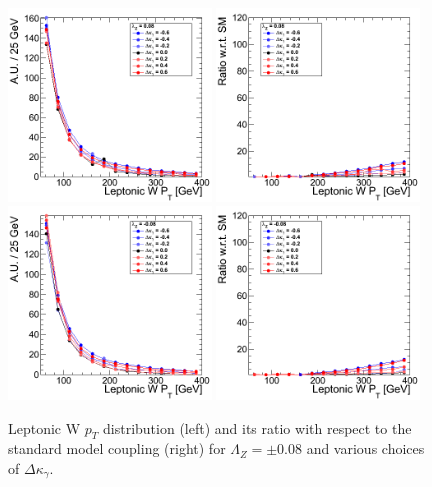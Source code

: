 \begin{figure}[h!t]
  {\centering
    \includegraphics[width=0.48\textwidth]{figs/LeptonicWpT_008.png}
    \includegraphics[width=0.48\textwidth]{figs/LeptonicWpT_008_ratio.png}
    \includegraphics[width=0.48\textwidth]{figs/LeptonicWpT_m008.png}
    \includegraphics[width=0.48\textwidth]{figs/LeptonicWpT_m008_ratio.png}
    \caption{Leptonic W $p_T$ distribution (left) and its ratio with respect to 
    the standard model coupling (right) for $\Lambda_Z = \pm 0.08$ and various choices of $\Delta{\kappa_\gamma}$.}
    \label{fig:ww_LeptonicWpT_atgcRatio008}}
\end{figure}
